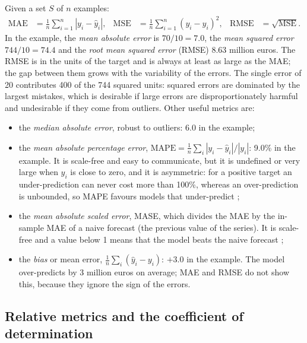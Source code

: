 Given a set $S$ of $n$ examples:
\begin{align}
  \mathrm{MAE}&=\frac1n\sum_{i=1}^n|y_i-\hat y_i|, &
  \mathrm{MSE}&=\frac1n\sum_{i=1}^n(y_i-\hat y_i)^2, &
  \mathrm{RMSE}&=\sqrt{\mathrm{MSE}}.
\end{align}
In the example, the \emph{mean absolute error} is $70/10=7.0$, the \emph{mean squared error}
$744/10=74.4$ and the \emph{root mean squared error} (RMSE) 8.63 million euros. The RMSE is in the
units of the target and is always at least as large as the MAE; the gap between them grows
with the variability of the errors. The single error of 20 contributes 400 of the 744 squared
units: squared errors are dominated by the largest mistakes, which is desirable if large
errors are disproportionately harmful and undesirable if they come from outliers. Other
useful metrics are:
\begin{itemize}
  \item the \emph{median absolute error}, robust to outliers: 6.0 in the example;
  \item the \emph{mean absolute percentage error},
        $\mathrm{MAPE}=\frac1n\sum_i|y_i-\hat y_i|/|y_i|$: 9.0\% in the example. It is
        scale-free and easy to communicate, but it is undefined or very large when $y_i$ is close
        to zero, and it is asymmetric: for a positive target an under-prediction can never cost
        more than 100\%, whereas an over-prediction is unbounded, so MAPE favours models that
        under-predict \citep{hyndman2006another};
  \item the \emph{mean absolute scaled error}, MASE, which divides the MAE by the in-sample
        MAE of a naive forecast (the previous value of the series). It is scale-free and a
        value below 1 means that the model beats the naive forecast \citep{hyndman2006another};
  \item the \emph{bias} or mean error, $\frac1n\sum_i(\hat y_i-y_i)$: $+3.0$ in the example.
        The model over-predicts by 3 million euros on average; MAE and RMSE do not show this, because they ignore the sign of the errors.
\end{itemize}

\subsection{Relative metrics and the coefficient of determination}

